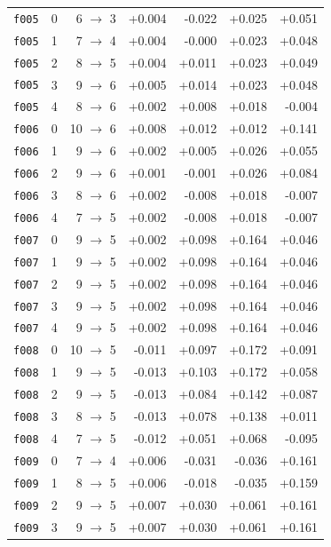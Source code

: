\documentclass[11pt]{article}
\begin{document}
\begin{table}[htbp]
\begin{tabular}{llrrrrr}
\texttt{f005} & 0 & 6 $\to$ 3 & +0.004 & -0.022 & +0.025 & +0.051 \\
\texttt{f005} & 1 & 7 $\to$ 4 & +0.004 & -0.000 & +0.023 & +0.048 \\
\texttt{f005} & 2 & 8 $\to$ 5 & +0.004 & +0.011 & +0.023 & +0.049 \\
\texttt{f005} & 3 & 9 $\to$ 6 & +0.005 & +0.014 & +0.023 & +0.048 \\
\texttt{f005} & 4 & 8 $\to$ 6 & +0.002 & +0.008 & +0.018 & -0.004 \\
\texttt{f006} & 0 & 10 $\to$ 6 & +0.008 & +0.012 & +0.012 & +0.141 \\
\texttt{f006} & 1 & 9 $\to$ 6 & +0.002 & +0.005 & +0.026 & +0.055 \\
\texttt{f006} & 2 & 9 $\to$ 6 & +0.001 & -0.001 & +0.026 & +0.084 \\
\texttt{f006} & 3 & 8 $\to$ 6 & +0.002 & -0.008 & +0.018 & -0.007 \\
\texttt{f006} & 4 & 7 $\to$ 5 & +0.002 & -0.008 & +0.018 & -0.007 \\
\texttt{f007} & 0 & 9 $\to$ 5 & +0.002 & +0.098 & +0.164 & +0.046 \\
\texttt{f007} & 1 & 9 $\to$ 5 & +0.002 & +0.098 & +0.164 & +0.046 \\
\texttt{f007} & 2 & 9 $\to$ 5 & +0.002 & +0.098 & +0.164 & +0.046 \\
\texttt{f007} & 3 & 9 $\to$ 5 & +0.002 & +0.098 & +0.164 & +0.046 \\
\texttt{f007} & 4 & 9 $\to$ 5 & +0.002 & +0.098 & +0.164 & +0.046 \\
\texttt{f008} & 0 & 10 $\to$ 5 & -0.011 & +0.097 & +0.172 & +0.091 \\
\texttt{f008} & 1 & 9 $\to$ 5 & -0.013 & +0.103 & +0.172 & +0.058 \\
\texttt{f008} & 2 & 9 $\to$ 5 & -0.013 & +0.084 & +0.142 & +0.087 \\
\texttt{f008} & 3 & 8 $\to$ 5 & -0.013 & +0.078 & +0.138 & +0.011 \\
\texttt{f008} & 4 & 7 $\to$ 5 & -0.012 & +0.051 & +0.068 & -0.095 \\
\texttt{f009} & 0 & 7 $\to$ 4 & +0.006 & -0.031 & -0.036 & +0.161 \\
\texttt{f009} & 1 & 8 $\to$ 5 & +0.006 & -0.018 & -0.035 & +0.159 \\
\texttt{f009} & 2 & 9 $\to$ 5 & +0.007 & +0.030 & +0.061 & +0.161 \\
\texttt{f009} & 3 & 9 $\to$ 5 & +0.007 & +0.030 & +0.061 & +0.161 \\

\end{tabular}
\end{table}
\end{document}
